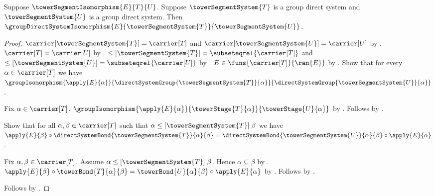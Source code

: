 \begin{theorem}\label{tower_segment_isomorphism_is_system_isomorphism}
    Suppose $\towerSegmentIsomorphism{E}{T}{U}$.
    Suppose $\towerSegmentSystem{T}$ is a group direct system and
        $\towerSegmentSystem{U}$ is a group direct system.
    Then $\groupDirectSystemIsomorphism{E}
        {\towerSegmentSystem{T}}{\towerSegmentSystem{U}}$.
\end{theorem}
\begin{proof}
    $\carrier[\towerSegmentSystem{T}]=\carrier[T]$ and
        $\carrier[\towerSegmentSystem{U}]=\carrier[U]$ by
        .
    $\carrier[T]=\carrier[U]$ by
        .
    $\leq[\towerSegmentSystem{T}]=\subseteqrel{\carrier[T]}$ and
        $\leq[\towerSegmentSystem{U}]=\subseteqrel{\carrier[U]}$ by
        .
    $E\in\funs{\carrier[T]}{\ran{E}}$ by
        .
    Show that for every $\alpha\in\carrier[T]$ we have
        $\groupIsomorphism{\apply{E}{\alpha}}
            {\directSystemGroup{\towerSegmentSystem{T}}{\alpha}}
            {\directSystemGroup{\towerSegmentSystem{U}}{\alpha}}$.
    \begin{subproof}
        Fix $\alpha\in\carrier[T]$.
        $\groupIsomorphism{\apply{E}{\alpha}}
            {\towerStage{T}{\alpha}}{\towerStage{U}{\alpha}}$ by
            .
        Follows by .
    \end{subproof}
    Show that for all $\alpha,\beta\in\carrier[T]$ such that
        $\alpha\mathrel{\leq[\towerSegmentSystem{T}]}\beta$ we have
        $\apply{E}{\beta}\circ
            \directSystemBond{\towerSegmentSystem{T}}{\alpha}{\beta}=
        \directSystemBond{\towerSegmentSystem{U}}{\alpha}{\beta}\circ
            \apply{E}{\alpha}$.
    \begin{subproof}
        Fix $\alpha,\beta\in\carrier[T]$.
        Assume $\alpha\mathrel{\leq[\towerSegmentSystem{T}]}\beta$.
        Hence $\alpha\subseteq\beta$ by
            .
        $\apply{E}{\beta}\circ\towerBond{T}{\alpha}{\beta}=
            \towerBond{U}{\alpha}{\beta}\circ\apply{E}{\alpha}$ by
            .
        Follows by .
    \end{subproof}
    Follows by .
\end{proof}

